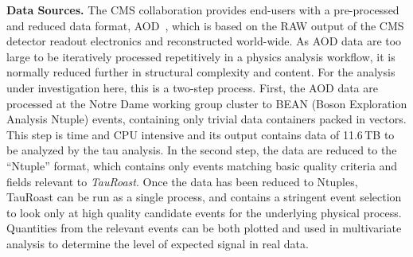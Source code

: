 {\bf Data Sources.}
The CMS collaboration provides end-users with a pre-processed
and reduced data format, AOD~\cite{holtman2001cms}, 
which is based on the RAW output of the CMS detector readout electronics and reconstructed world-wide.
As AOD data are too large to be iteratively processed repetitively in
a physics analysis workflow, it is normally reduced further in
structural complexity and content.  For the analysis under
investigation here, this is a two-step process.  First, the AOD data
are processed at the Notre Dame working group cluster to BEAN (Boson Exploration Analysis Ntuple) events,
containing only trivial data containers packed in vectors.  This step
is time and CPU intensive and its output contains data of 11.6$\,$TB to be
analyzed by the tau analysis.
In the second step, the data are reduced to the ``Ntuple'' format,
which contains only events matching basic quality criteria and
fields relevant to \emph{TauRoast}.
Once the data has been reduced to Ntuples, TauRoast can be run as a single
process, and contains a stringent event selection to look only at high
quality candidate events for the underlying physical process.
Quantities from the relevant events can be
both plotted and used in multivariate analysis to determine the level
of expected signal in real data.

